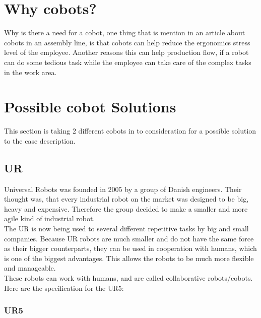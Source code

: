 \section{Why cobots?}\label{ch:Whycobot}
Why is there a need for a cobot, one thing that is mention in an article about cobots in an assembly line, is that cobots can help reduce the ergonomics stress level of the employee\cite{Coboau}. Another reasons this can help production flow, if a robot can do some tedious task while the employee can take care of the complex tasks in the work area.\\
\section{Possible cobot Solutions} \label{ch:UR}

This section is taking 2 different cobots in to consideration for a possible solution to the case description.

\subsection{UR}

Universal Robots was founded in 2005 by a group of Danish engineers. Their thought was, that every industrial robot on the market was designed to be big, heavy and expensive. Therefore the group decided to make a smaller and more agile kind of industrial robot.\cite{Urhist}\\


The UR is now being used to several different repetitive tasks by big and small companies.
Because UR robots are much smaller and do not have the same force as their bigger counterparts, they can be used in cooperation with humans, which is one of the biggest advantages. This allows the robots to be much more flexible and manageable.\\



These robots can work with humans, and are called collaborative robots/cobots.\\
Here are the specification for the UR5:\\ 

\subsubsection{UR5}

